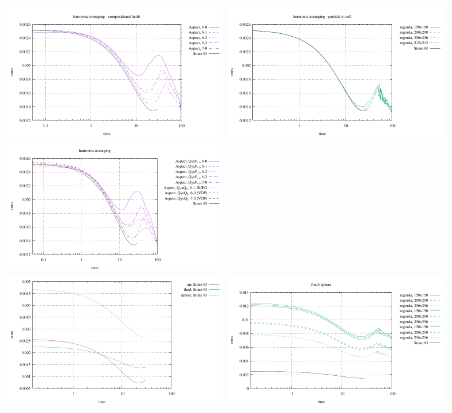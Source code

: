\begin{center}
\includegraphics[width=5.7cm]{images/stokes_sphere_fs2D/vrms_harm_comp}
\includegraphics[width=5.7cm]{images/stokes_sphere_fs2D/vrms_harm_pic}
\includegraphics[width=5.7cm]{images/stokes_sphere_fs2D/vrms_harm_add}\\
\includegraphics[width=5.7cm]{images/stokes_sphere_fs2D/vrms_afs}
\includegraphics[width=5.7cm]{images/stokes_sphere_fs2D/vrms_fs}
\end{center}

